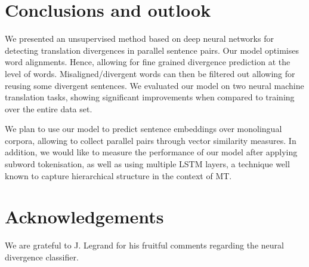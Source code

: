 \documentclass[11pt,a4paper]{article}
\begin{document}
\section{Conclusions and outlook}
\label{conclusions+further}

We presented an unsupervised method based on deep neural networks for detecting translation divergences in parallel sentence pairs. 
Our model optimises word alignments. Hence, allowing for fine grained divergence prediction at the level of words. 
Misaligned/divergent words can then be filtered out allowing for reusing some divergent sentences. 
We evaluated our model on two neural machine translation tasks, showing significant improvements when compared to training over the entire data set. 

We plan to use our model to predict sentence embeddings over monolingual corpora, allowing to collect parallel pairs through vector similarity measures.
In addition, we would like to measure the performance of our model after applying subword tokenisation,
as well as using multiple LSTM layers, a technique well known to capture hierarchical structure in the context of MT.

\section*{Acknowledgements}
We are grateful to J. Legrand for his fruitful comments regarding the neural divergence classifier.



\end{document}
